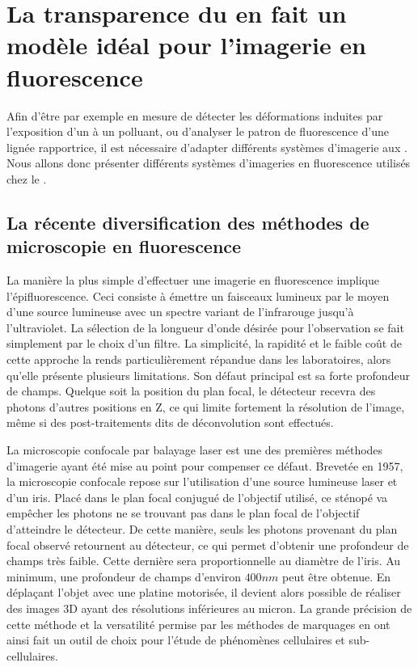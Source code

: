 \documentclass[\main/main.tex]{subfiles}
\begin{document}
            
\section{La transparence du \pz{} en fait un modèle idéal pour l'imagerie en fluorescence}

\label{sec:imagerie}

Afin d'être par exemple en mesure de détecter les déformations induites par l'exposition d'un \pz{} à un polluant,
ou d'analyser le patron de fluorescence d'une lignée rapportrice,
il est nécessaire d'adapter différents systèmes d'imagerie aux \pz{}.
%
Nous allons donc présenter différents systèmes d'imageries en fluorescence utilisés chez le \pz{}.

    \subsection{La récente diversification des méthodes de microscopie en fluorescence}
    
La manière la plus simple d'effectuer une imagerie en fluorescence implique l'épifluorescence.
Ceci consiste à émettre un faisceaux lumineux par le moyen d'une source lumineuse avec un spectre variant de l'infrarouge jusqu'à l'ultraviolet.
%
La sélection de la longueur d'onde désirée pour l'observation se fait simplement par le choix d'un filtre.
%
La simplicité, la rapidité et le faible coût de cette approche la rends particulièrement répandue dans les laboratoires, alors qu'elle présente plusieurs limitations.
%
Son défaut principal est sa forte profondeur de champs.
%
Quelque soit la position du plan focal, le détecteur recevra des photons d'autres positions en Z, ce qui limite fortement la résolution de l'image, même si des post-traitements dits de déconvolution sont effectués.


%
La microscopie confocale par balayage laser est une des premières méthodes d'imagerie ayant été mise au point pour compenser ce défaut. 
%
Brevetée en 1957, la microscopie confocale repose sur l'utilisation d'une source lumineuse laser et d'un iris.
%
Placé dans le plan focal conjugué de l'objectif utilisé, ce sténopé va empêcher les photons ne se trouvant pas dans le plan focal de l'objectif d'atteindre le détecteur.
%
De cette manière, seuls les photons provenant du plan focal observé retournent au détecteur, ce qui permet d'obtenir une profondeur de champs très faible.
%
Cette dernière sera proportionnelle au diamètre de l'iris. Au minimum, une profondeur de champs d'environ $400 nm$ peut être obtenue.
%
En déplaçant l'objet avec une platine motorisée, il devient alors possible de réaliser des images 3D ayant des résolutions inférieures au micron.
%
La grande précision de cette méthode et la versatilité permise par les méthodes de marquages en ont ainsi fait un outil de choix pour l'étude de phénomènes cellulaires et sub-cellulaires.
\end{document}
